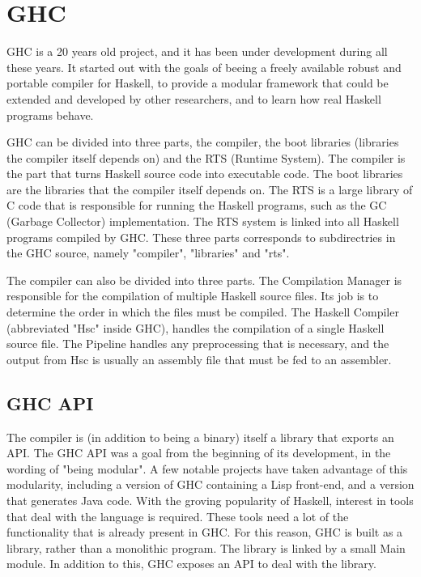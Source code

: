 


\section{GHC}

GHC is a 20 years old project, and it has been under development during
all these years. It started out with the goals of beeing a freely available
robust and portable compiler for Haskell, to provide a modular framework that
could be extended and developed by other researchers, and to learn how real
Haskell programs behave. \cite{marlow2012glasgow}

GHC can be divided into three parts, the compiler, the boot libraries
(libraries the compiler itself depends on) and the RTS (Runtime System). 
The compiler is the part
that turns Haskell source code into executable code. The boot libraries are the 
libraries that the compiler itself depends on. The RTS is a large library
of C code that is responsible for running the Haskell programs, such as the 
GC (Garbage Collector) implementation. The RTS system is linked into all 
Haskell programs compiled by GHC. These three parts corresponds to subdirectries
in the GHC source, namely "compiler", "libraries" and "rts".
\cite{marlow2012glasgow}

The compiler can also be divided into three parts. The Compilation Manager is 
responsible for the compilation of multiple Haskell source files. Its job is to
determine the order in which the files must be compiled. The Haskell Compiler 
(abbreviated "Hsc" inside GHC), handles the compilation of a single Haskell source
file. The Pipeline handles any preprocessing that is necessary, and the output
from Hsc is usually an assembly file that must be fed to an assembler.


\subsection{GHC API}

The compiler is (in addition to being a binary) itself a library that exports an API.
The GHC API was a goal from the beginning of its development, in the wording of
"being modular". A few notable projects have taken advantage of this modularity,
including a version of GHC containing a Lisp front-end, and a version that generates
Java code. With the groving popularity of Haskell, interest in tools that deal with
the language is required. These tools need a lot of the functionality that is already
present in GHC. For this reason, GHC is built as a library, rather than a monolithic
program. The library is linked by a small Main module. In addition to this, GHC
exposes an API to deal with the library.\cite{marlow2012glasgow} 

